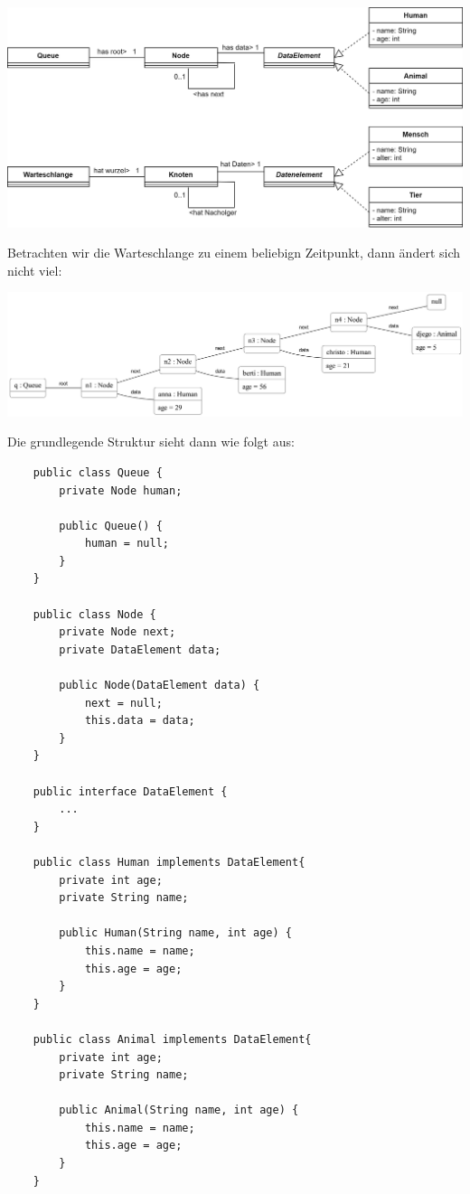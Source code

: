 \documentclass{article}
\begin{document}
\begin{center}
    \includegraphics[scale = 0.2]{../../media/linked_list_nodes_diagram_interface.png}
\end{center}
Betrachten wir die Warteschlange zu einem beliebign Zeitpunkt, dann ändert sich nicht viel: 

\begin{center}
    \includegraphics[scale = 0.125]{../../media/linked_list_nodes_objectdiagram_v2.png}
\end{center}
Die grundlegende Struktur sieht dann wie folgt aus: 
\begin{verbatim}
    public class Queue {
        private Node human;

        public Queue() {
            human = null;
        }
    }

    public class Node {
        private Node next;
        private DataElement data;

        public Node(DataElement data) {
            next = null;
            this.data = data;
        }
    }

    public interface DataElement {
        ...
    }

    public class Human implements DataElement{
        private int age;
        private String name;

        public Human(String name, int age) {
            this.name = name;
            this.age = age;
        }
    }

    public class Animal implements DataElement{
        private int age;
        private String name;

        public Animal(String name, int age) {
            this.name = name;
            this.age = age;
        }     
    }
\end{verbatim}
\end{document}
